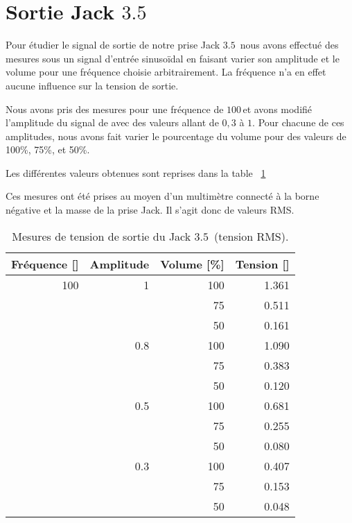 \section{Sortie Jack $3.5$\milli \meter}

Pour étudier le signal de sortie de notre prise Jack $3.5$ \milli \meter \,nous avons effectué des mesures sous un signal d'entrée sinusoïdal en faisant varier
son amplitude et le volume pour une fréquence choisie arbitrairement. La fréquence n'a en effet aucune influence sur la tension de sortie. 

Nous avons pris des mesures pour une fréquence de $100$\hertz \,et avons modifié l'amplitude du signal de avec des valeurs allant de $0,3$ à $1$. Pour chacune de ces amplitudes, nous avons fait varier le pourcentage du volume pour des valeurs de 100\%, 75\%, et 50\%.

Les différentes valeurs obtenues sont reprises dans la table ~\ref{tab : Sortie Jack} 

Ces mesures ont été prises au moyen d'un multimètre connecté à la borne négative et la masse de la prise Jack. Il s'agit donc de valeurs RMS.

\begin{table}
\begin {center}
\begin{tabular}{|r|r|r|r|}
\hline

	\textbf{Fréquence} [\hertz] & \textbf{Amplitude} & \textbf{Volume} [\%] & \textbf{Tension} [\volt] \\
\hline
		100 & 1 & 100 & 1.361 \\
	\cline{3-4}
	 	& & 75 & 0.511 \\
	\cline{3-4}
	 	& & 50 & 0.161 \\
	 \cline{2-4}
		 & 0.8 & 100 & 1.090 \\
        \cline{3-4}
		 & & 75 & 0.383 \\
		  \cline{3-4}
		 & & 50 & 0.120 \\
	 \cline{2-4}
	 	& 0.5 & 100 & 0.681\\
		 \cline{3-4}
	 	& & 75 & 0.255 \\
		 \cline{3-4}
	 	& & 50 & 0.080 \\
	 \cline{2-4}
	 	& 0.3 & 100 & 0.407 \\
		 \cline{3-4}
	 	& & 75 & 0.153 \\
		 \cline{3-4}
	 	& & 50 & 0.048 \\
\hline
\end{tabular}
\caption{Mesures de tension de sortie du Jack $3.5$ \milli \meter \,(tension RMS).}
\label{tab : Sortie Jack}
\end{center}
\end{table}
